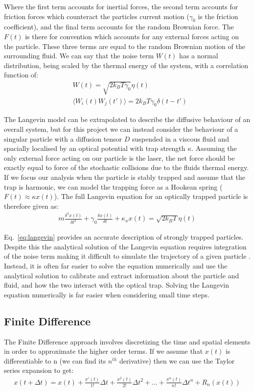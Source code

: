 Where the first term accounts for inertial forces, the second 
term accounts for friction forces which counteract the particles 
current motion ($\gamma_0$ is the friction coefficient), and 
the final term accounts for the random Brownian force. The 
$F(t)$ is there for convention which accounts for any external 
forces acting on the particle. These three terms are equal to 
the random Brownian motion of the surrounding fluid. We can 
say that the noise term $W(t)$ has a normal distribution, 
being scaled by the thermal energy of the system, with a 
correlation function of:
\begin{align}
	&W(t) = \sqrt{2k_BT\gamma_0}\eta(t) \\
	&\langle W_i(t)W_j(t')\rangle = 2k_BT\gamma_0\delta(t-t')
\end{align}

The Langevin model can be extrapolated to describe the diffusive 
behaviour of an overall system, but for this project we can 
instead consider the behaviour of a singular particle with a diffusion 
tensor $D$ suspended in a viscous fluid and spacially localised 
by an optical potential with trap strength $\kappa$. Assuming the 
only external force acting on our particle is the laser, the net 
force should be exactly equal to force of the stochastic collisions 
due to the fluids thermal energy. If we focus our analysis when 
the particle is stably trapped and assume that the trap is harmonic, 
we can model the trapping force as a Hookean spring ($F(t) \approx 
\kappa x(t)$). The full Langevin equation for an optically trapped 
particle is therefore given as:
\begin{align}
	\label{eq:langevin}
	m\frac{\delta^2x(t)}{\delta t^2} + \gamma_0 \frac{\delta x(t)}{\delta t} + \kappa_x x(t) = \sqrt{2k_BT}\eta(t)
\end{align}

Eq.~\eqref{eq:langevin} provides an accurate description of strongly 
trapped particles. Despite this the analytical solution of the 
Langevin equation requires integration of the noise term making 
it difficult to simulate the trajectory of a given particle 
\cite{Volpe2013}. Instead, it is often far easier to solve the 
equation numerically and use the analytical solution to calibrate 
and extract information about the particle and fluid, and how the 
two interact with the optical trap. Solving the Langevin equation
numerically is far easier when considering small time steps.

\subsection{Finite Difference}
The Finite Difference approach involves discretizing the time and 
spatial elements in order to approximate the higher order terms. 
If we assume that $x(t)$ is differentiable to n (we can find its 
$n^{th}$ derivative) then we can use the Taylor series expansion 
to get:
\begin{align}
	x(t+\Delta t) = x(t)+\frac{x'(t)}{1!}\Delta t + \frac{x^2(t)}{2!}\Delta t^2+...+\frac{x^n(t)}{n!}\Delta t^n+R_n(x(t))	
\end{align}

